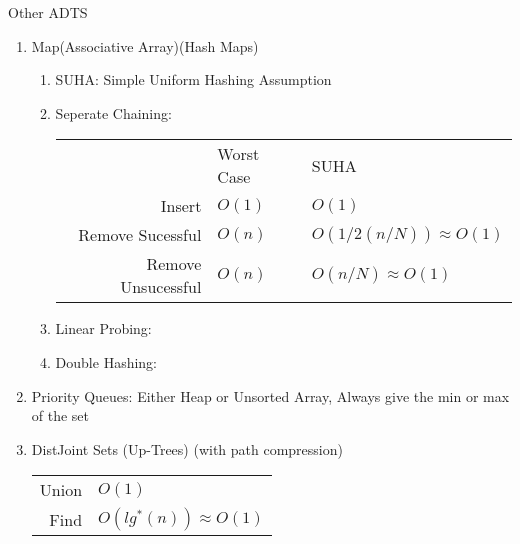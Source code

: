 \documentclass[12pt]{article}
\renewcommand{\=}[1]{\stackrel{#1}{=}} %
\theoremstyle{definition}
\theoremstyle{remark}
\begin{document}
\begin{enumerate}
\begin{enumerate}
\begin{enumerate}
      \end{enumerate}
    \end{enumerate}
    Other ADTS
    \begin{enumerate}
    \item Map(Associative Array)(Hash Maps)
      \begin{enumerate}
      \item SUHA: Simple Uniform Hashing Assumption
      \item Seperate Chaining:
        \begin{tabular}{r l l}
          & Worst Case & SUHA\\
          Insert & $O(1)$ & $O(1)$\\
          Remove Sucessful & $O(n)$ & $O(1/2(n/N))\approx{O(1)}$\\
          Remove Unsucessful & $O(n)$ & $O(n/N)\approx{O(1)}$
        \end{tabular}
      \item Linear Probing:
      \item Double Hashing:
      \end{enumerate}

    \item Priority Queues: Either Heap or Unsorted Array, Always give
      the min or max of the set
    \item DistJoint Sets (Up-Trees) (with path compression)
      \begin{tabular}{r l}
        Union & $O(1)$\\
        Find & $O(lg^*(n)) \approx O(1)$
      \end{tabular}

    \end{enumerate}
  \end{enumerate}
  
\end{document}
